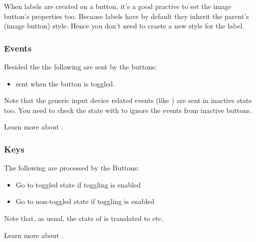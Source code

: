 \documentclass[letterpaper,10pt,english]{sphinxmanual}
\begin{document}
When labels are created on a button, it’s a good practive to set the image button’s  properties too. Because labels have  by default they inherit the parent’s (image button) style.
Hence you don’t need to craete a new style for the label.


\subsubsection{Events}
\label{\detokenize{object-types/imgbtn:events}}
Besided the  the following  are sent by the buttons:
\begin{itemize}
\item {} 
 sent when the button is toggled.

\end{itemize}

Note that the generic input device related events (like ) are sent in inactive state too. You need to check the state with  to ignore the events from inactive buttons.

Learn more about {\hyperref[\detokenize{overview/events::doc}]{}}.


\subsubsection{Keys}
\label{\detokenize{object-types/imgbtn:keys}}
The following  are processed by the Buttons:
\begin{itemize}
\item {} 
 Go to toggled state if toggling is enabled

\item {} 
 Go to non-toggled state if toggling is  enabled

\end{itemize}

Note that, as usual, the state of  is translated to  etc.

Learn more about {\hyperref[\detokenize{overview/indev::doc}]{}}.
\end{document}
